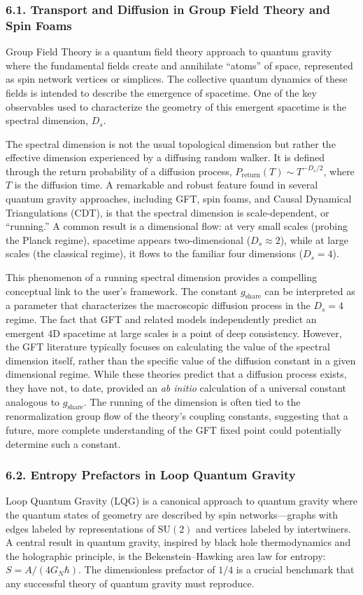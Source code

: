 \documentclass[11pt]{article}
\begin{document}
\subsubsection*{6.1. Transport and Diffusion in Group Field Theory and Spin Foams}
Group Field Theory is a quantum field theory approach to quantum gravity where the fundamental fields create and annihilate “atoms” of space, represented as spin network vertices or simplices. The collective quantum dynamics of these fields is intended to describe the emergence of spacetime. One of the key observables used to characterize the geometry of this emergent spacetime is the spectral dimension, $D_s$.

The spectral dimension is not the usual topological dimension but rather the effective dimension experienced by a diffusing random walker. It is defined through the return probability of a diffusion process, $P_{\text{return}}(T) \sim T^{-D_s/2}$, where $T$ is the diffusion time. A remarkable and robust feature found in several quantum gravity approaches, including GFT, spin foams, and Causal Dynamical Triangulations (CDT), is that the spectral dimension is scale-dependent, or “running.” A common result is a dimensional flow: at very small scales (probing the Planck regime), spacetime appears two-dimensional ($D_s \approx 2$), while at large scales (the classical regime), it flows to the familiar four dimensions ($D_s = 4$).

This phenomenon of a running spectral dimension provides a compelling conceptual link to the user’s framework. The constant $g_{\mathrm{share}}$ can be interpreted as a parameter that characterizes the macroscopic diffusion process in the $D_s = 4$ regime. The fact that GFT and related models independently predict an emergent 4D spacetime at large scales is a point of deep consistency. However, the GFT literature typically focuses on calculating the value of the spectral dimension itself, rather than the specific value of the diffusion constant in a given dimensional regime. While these theories predict that a diffusion process exists, they have not, to date, provided an \emph{ab initio} calculation of a universal constant analogous to $g_{\mathrm{share}}$. The running of the dimension is often tied to the renormalization group flow of the theory’s coupling constants, suggesting that a future, more complete understanding of the GFT fixed point could potentially determine such a constant.

\subsubsection*{6.2. Entropy Prefactors in Loop Quantum Gravity}
Loop Quantum Gravity (LQG) is a canonical approach to quantum gravity where the quantum states of geometry are described by spin networks—graphs with edges labeled by representations of $\mathrm{SU}(2)$ and vertices labeled by intertwiners. A central result in quantum gravity, inspired by black hole thermodynamics and the holographic principle, is the Bekenstein–Hawking area law for entropy: $S = A/(4 G_N \hbar)$. The dimensionless prefactor of $1/4$ is a crucial benchmark that any successful theory of quantum gravity must reproduce.
\end{document}
